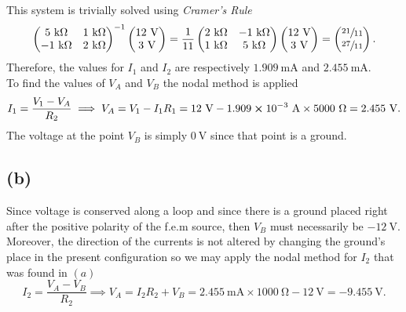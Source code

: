 \documentclass[
	12pt,
	]{article}
\theoremstyle{definition}
\theoremstyle{definition}
\theoremstyle{definition}
\theoremstyle{definition}
\theoremstyle{definition}
\theoremstyle{example}
\theoremstyle{note}
\theoremstyle{remark}
\theoremstyle{example}
\begin{document}
				This system is trivially solved using \textit{Cramer's Rule}
				$$ \begin{pmatrix}
													5 \ \si{\kilo\ohm} & 1 \ \si{\kilo\ohm} \\ -1 \ \si{\kilo\ohm} & 2 \ \si{\kilo\ohm} 
												\end{pmatrix}^{-1}
												\begin{pmatrix}
												12 \ \si{\volt} \\ 3 \ \si{\volt}
												\end{pmatrix} = \frac{1}{11}
				\begin{pmatrix}
																	2 \ \si{\kilo\ohm} & -1 \ \si{\kilo\ohm} \\ 1 \ \si{\kilo\ohm} & 5 \ \si{\kilo\ohm} 
																\end{pmatrix}	
																\begin{pmatrix}
																												12 \ \si{\volt} \\ 3 \ \si{\volt}
																												\end{pmatrix} = \begin{pmatrix}
																													\sfrac{21}{11} \\ \sfrac{27}{11}
																												\end{pmatrix}							
												.$$
			Therefore, the values for $I_{1}$ and $I_{2}$ are respectively $1.909 \ \si{\milli\ampere}$ and $2.455 \ \si{\milli\ampere}$. \\
			
			\noindent To find the values of $V_{A}$ and $V_{B}$ the nodal method is applied
			$$ I_{1} = \frac{V_{1} - V_{A}}{R_{2}} \implies V_{A} = V_{1}-I_{1}R_{1} = 12 \ \si{\volt} - 1.909\cross10^{-3} \ \si{\ampere} \times 5000 \ \si{\ohm} = 2.455 \ \si{\volt}. $$
			The voltage at the point $V_{B}$ is simply $0 \ \si{\volt}$ since that point is a ground.
			\subsection*{(b)}
				 Since voltage is conserved along a loop and since there is a ground placed right after the positive polarity of the f.e.m source, then $V_{B}$ must necessarily be $-12 \ \si{\volt}$. Moreover, the direction of the currents is not altered by changing the ground's place in the present configuration so we may apply the nodal method for $I_{2}$ that was found in $(a)$
				 $$ I_{2} = \frac{V_{A} - V_{B}}{R_{2}} \implies V_{A} = I_{2}R_{2} + V_{B} = 2.455 \ \si{\milli\ampere} \times 1000 \ \si{\ohm} - 12 \ \si{\volt} = -9.455 \ \si{\volt}.$$
\end{document}
